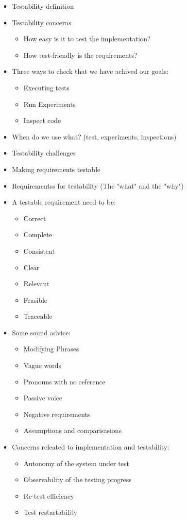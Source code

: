 		\begin{itemize}
			\item Testability definition
			\item Testability concerns
				\begin{itemize}
					\item How easy is it to test the implementation?
					\item How test-friendly is the requirements?
				\end{itemize}
			\item Three ways to check that we have achived our goals:
				\begin{itemize}
					\item Executing tests
					\item Run Experiments
					\item Inspect code
				\end{itemize}
			\item When do we use what? (test, experiments, inspections)
			\item Testability challenges
			\item Making requirements testable
			\item Requirementss for testability (The "what" and the "why")
			\item A testable requirement need to be:	
				\begin{itemize}
					\item Correct
					\item Complete
					\item Consistent
					\item Clear
					\item Relevant
					\item Feasible
					\item Traceable
				\end{itemize}
			\item Some sound advice:
				\begin{itemize}
					\item Modifying Phrases
					\item Vague words
					\item Pronouns with no reference
					\item Passive voice
					\item Negative requirements
					\item Assumptions and comparisasions
				\end{itemize}
			\item Concerns releated to implementation and testability:
				\begin{itemize}
					\item Autonomy of the system under test
					\item Observability of the testing progress
					\item Re-test efficiency
					\item Test restartability
				\end{itemize}
		\end{itemize}


